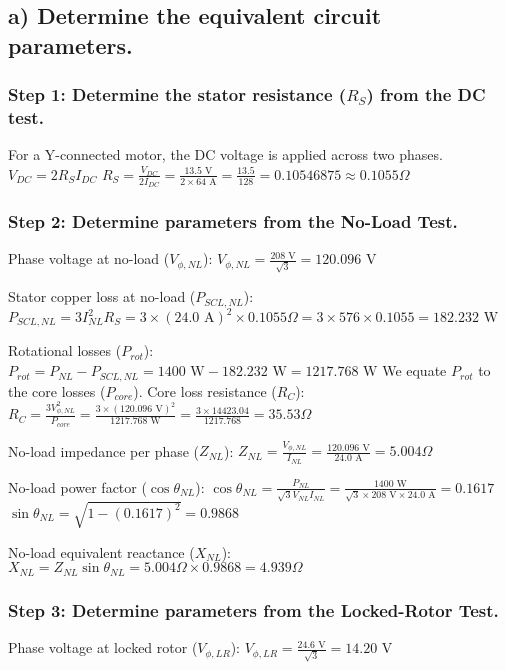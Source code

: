 \documentclass{article}
\begin{document}
	\subsection*{a) Determine the equivalent circuit parameters.}
	
	\subsubsection*{Step 1: Determine the stator resistance ($R_S$) from the DC test.}
	For a Y-connected motor, the DC voltage is applied across two phases.
	$V_{DC} = 2 R_S I_{DC}$
	$R_S = \frac{V_{DC}}{2 I_{DC}} = \frac{13.5 \text{ V}}{2 \times 64 \text{ A}} = \frac{13.5}{128} = 0.10546875 \approx 0.1055 \Omega$
	
	\subsubsection*{Step 2: Determine parameters from the No-Load Test.}
	Phase voltage at no-load ($V_{\phi,NL}$):
	$V_{\phi,NL} = \frac{208 \text{ V}}{\sqrt{3}} = 120.096 \text{ V}$
	
	Stator copper loss at no-load ($P_{SCL,NL}$):
	$P_{SCL,NL} = 3 I_{NL}^2 R_S = 3 \times (24.0 \text{ A})^2 \times 0.1055 \Omega = 3 \times 576 \times 0.1055 = 182.232 \text{ W}$
	
	Rotational losses ($P_{rot}$):
	$P_{rot} = P_{NL} - P_{SCL,NL} = 1400 \text{ W} - 182.232 \text{ W} = 1217.768 \text{ W}$
	We equate $P_{rot}$ to the core losses ($P_{core}$).
	Core loss resistance ($R_C$):
	$R_C = \frac{3 V_{\phi,NL}^2}{P_{core}} = \frac{3 \times (120.096 \text{ V})^2}{1217.768 \text{ W}} = \frac{3 \times 14423.04}{1217.768} = 35.53 \Omega$
	
	No-load impedance per phase ($Z_{NL}$):
	$Z_{NL} = \frac{V_{\phi,NL}}{I_{NL}} = \frac{120.096 \text{ V}}{24.0 \text{ A}} = 5.004 \Omega$
	
	No-load power factor ($\cos \theta_{NL}$):
	$\cos \theta_{NL} = \frac{P_{NL}}{\sqrt{3} V_{NL} I_{NL}} = \frac{1400 \text{ W}}{\sqrt{3} \times 208 \text{ V} \times 24.0 \text{ A}} = 0.1617$
	$\sin \theta_{NL} = \sqrt{1 - (0.1617)^2} = 0.9868$
	
	No-load equivalent reactance ($X_{NL}$):
	$X_{NL} = Z_{NL} \sin \theta_{NL} = 5.004 \Omega \times 0.9868 = 4.939 \Omega$
	
	\subsubsection*{Step 3: Determine parameters from the Locked-Rotor Test.}
	Phase voltage at locked rotor ($V_{\phi,LR}$):
	$V_{\phi,LR} = \frac{24.6 \text{ V}}{\sqrt{3}} = 14.20 \text{ V}$
	
\end{document}
